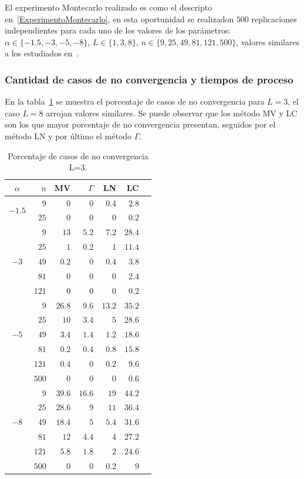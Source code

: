 El experimento Montecarlo realizado es como el descripto en~\ref{ExperimentoMontecarlo}, en esta oportunidad se realizadon $500$ replicaciones independientes para cada uno de los valores de los parámetros: 
$\alpha\in\{-1.5, -3, -5, -8\}$, $L\in\{1,3,8\}$, $n\in\{9, 25,49, 81,121,500\}$, valores similares a los estudiados en~\cite{gambini2015}. 

\subsubsection{Cantidad de casos de no convergencia y tiempos de proceso}
En la tabla~\ref{NoConvMLyNGyLNyLC_L=3} se muestra el porcentaje de casos de no convergencia para $L=3$, el caso $L=8$ arrojan valores similares. Se puede observar que los método MV y LC son los que mayor porcentaje de no convergencia presentan, seguidos por el método LN y por último el método $\Gamma$. 

\begin{table}[hbt]
	\caption{Porcentaje de casos de no convergencia  L=$3$.}
	\centering
	\label{NoConvMLyNGyLNyLC_L=3}
	\begin{tabular}{c*6{r}}
			\toprule		
			$\alpha$ & $n$ & MV & $\Gamma$ & LN &  LC\\
			\midrule
			\multirow{2 }{*}{$-1.5$} 
			&   $9$ & $0$ & $0$ & $0.4$ &  $2.8$\\
			&  $25$ & $0$ & $0$ & $0$ & $0.2$\\
			\midrule
			\multirow{5 }{*}{$-3$} 
			&   $9$ & $13$    & $5.2$  & $7.2$  &  $28.4$\\ 
			&  $25$ & $1$     & $0.2$  & $1$    &  $11.4$\\
			&  $49$ & $0.2$   & $0$    & $0.4$  & $3.8$\\ 
			&  $81$ & $0$     & $0$    & $0$    & $2.4$\\ 
			& $121$ & $0$     & $0$    & $0$    & $0.2$\\ 
			\midrule
			\multirow{5 }{*}{$-5$} 
			&   $9$ & $26.8$  & $9.6$  & $13.2$ &  $35.2$\\ 
			&  $25$ & $10$    & $3.4$  & $5$    & $28.6$\\ 
			&  $49$ & $3.4$   & $1.4$  & $1.2$  & $18.6$\\ 
			&  $81$ & $0.2$   & $0.4$  & $0.8$  & $15.8$\\ 
			& $121$ & $0.4$   & $0$    & $0.2$  & $9.6$\\ 
			& $500$ & $0$     & $0$    & $0$    & $0.6$\\ 
			\midrule
			\multirow{5 }{*}{$-8$} 
			&   $9$  & $39.6$ & $16.6$ & $19$   & $44.2$\\ 
			&  $25$  & $28.6$ & $9$    & $11$   & $36.4$\\ 
			&  $49$  & $18.4$ & $5$    & $5.4$  & $31.6$\\ 
			&  $81$  & $12$   & $4.4$  & $4$    & $27.2$\\ 
			& $121$  & $5.8$  & $1.8$  & $2$    & $24.6$\\ 
			& $500$  & $0$    & $0$    & $0.2$  & $9$\\
			\bottomrule 	
		\end{tabular}
\end{table}	

